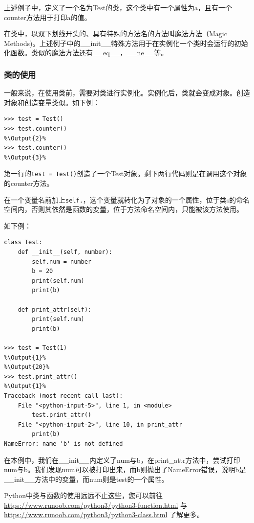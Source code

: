 \documentclass[../../Main.tex]{subfiles}
\begin{document}
上述例子中，定义了一个名为Test的类，这个类中有一个属性为a，且有一个counter方法用于打印a的值。
\begin{ExtraKnowledge}
    在类中，以双下划线开头的、具有特殊的方法名的方法叫魔法方法（Magic Methods)。上述例子中的\_\_init\_\_特殊方法用于在实例化一个类时会运行的初始化函数。类似的魔法方法还有\_\_eq\_\_，\_\_ne\_\_等。
\end{ExtraKnowledge}

\subsubsection{类的使用}
一般来说，在使用类前，需要对类进行实例化。实例化后，类就会变成对象。创造对象和创造变量类似。如下例：

\begin{lstlisting}
>>> test = Test()
>>> test.counter()
%\Output{2}%
>>> test.counter()
%\Output{3}%
\end{lstlisting}

第一行的\verb|test = Test()|创造了一个Test对象。剩下两行代码则是在调用这个对象的counter方法。

在一个变量名前加上\verb|self.|，这个变量就转化为了对象的一个属性，位于类s的命名空间内，否则其依然是函数的变量，位于方法命名空间内，只能被该方法使用。

如下例：

\begin{lstlisting}
class Test:
    def __init__(self, number):
        self.num = number
        b = 20
        print(self.num)
        print(b)

    def print_attr(self):
        print(self.num)
        print(b)

>>> test = Test(1)
%\Output{1}%
%\Output{20}%
>>> test.print_attr()
%\Output{1}%
Traceback (most recent call last):
    File "<python-input-5>", line 1, in <module>
        test.print_attr()
    File "<python-input-2>", line 10, in print_attr
        print(b)
NameError: name 'b' is not defined
\end{lstlisting}

在本例中，我们在\_\_init\_\_内定义了num与b，在print\_attr方法中，尝试打印num与b。我们发现num可以被打印出来，而b则抛出了NameError错误，说明b是\_\_init\_\_方法中的变量，而num则是test的一个属性。

\begin{ExtraKnowledge}
    Python中类与函数的使用远远不止这些，您可以前往 \url{https://www.runoob.com/python3/python3-function.html} 与 \url{https://www.runoob.com/python3/python3-class.html} 了解更多。
\end{ExtraKnowledge}
\end{document}
